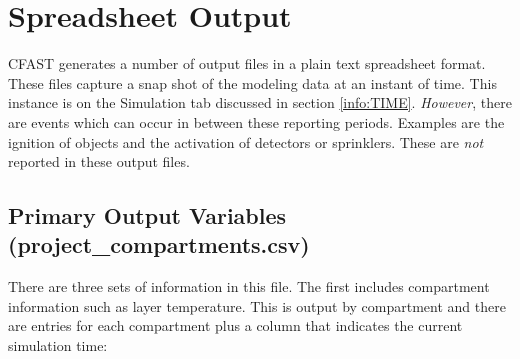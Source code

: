 \section{Spreadsheet Output}

CFAST generates a number of output files in a plain text spreadsheet format.  These files capture a snap shot of the modeling data at an instant of time. This instance is on the Simulation tab discussed in section \ref{info:TIME}. \emph{However}, there are events which can occur in between these reporting periods. Examples are the ignition of objects and the activation of detectors or sprinklers. These are \emph{not} reported in these output files.

\subsection{Primary Output Variables (project\_compartments.csv)}

There are three sets of information in this file. The first includes compartment information such as layer temperature. This is output by compartment and there are entries for each compartment plus a column that indicates the current simulation time:

